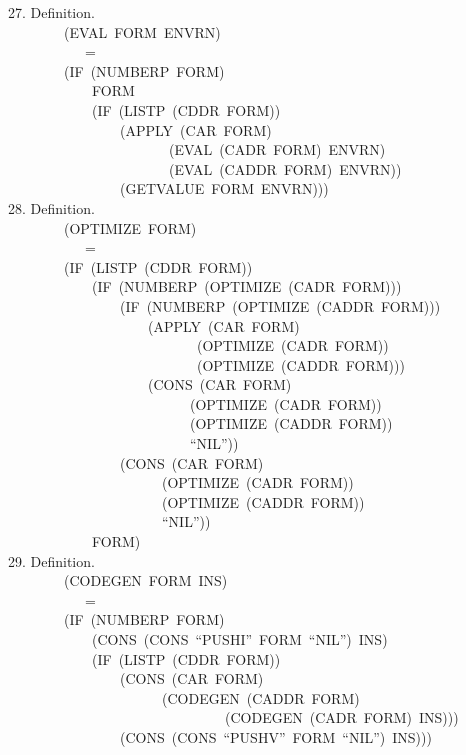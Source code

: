 \documentclass[10pt]{book}
\newenvironment{pubasis}{\begin{flushleft}}{\end{flushleft}}
\begin{document}
\begin{pubasis}
27.     Definition.\\
~~~~~~~~(EVAL~FORM~ENVRN)\\
~~~~~~~~~~~=\\
~~~~~~~~(IF~(NUMBERP~FORM)\\
~~~~~~~~~~~~FORM\\
~~~~~~~~~~~~(IF~(LISTP~(CDDR~FORM))\\
~~~~~~~~~~~~~~~~(APPLY~(CAR~FORM)\\
~~~~~~~~~~~~~~~~~~~~~~~(EVAL~(CADR~FORM)~ENVRN)\\
~~~~~~~~~~~~~~~~~~~~~~~(EVAL~(CADDR~FORM)~ENVRN))\\
~~~~~~~~~~~~~~~~(GETVALUE~FORM~ENVRN)))\\

28.     Definition.\\
~~~~~~~~(OPTIMIZE~FORM)\\
~~~~~~~~~~~=\\
~~~~~~~~(IF~(LISTP~(CDDR~FORM))\\
~~~~~~~~~~~~(IF~(NUMBERP~(OPTIMIZE~(CADR~FORM)))\\
~~~~~~~~~~~~~~~~(IF~(NUMBERP~(OPTIMIZE~(CADDR~FORM)))\\
~~~~~~~~~~~~~~~~~~~~(APPLY~(CAR~FORM)\\
~~~~~~~~~~~~~~~~~~~~~~~~~~~(OPTIMIZE~(CADR~FORM))\\
~~~~~~~~~~~~~~~~~~~~~~~~~~~(OPTIMIZE~(CADDR~FORM)))\\
~~~~~~~~~~~~~~~~~~~~(CONS~(CAR~FORM)\\
~~~~~~~~~~~~~~~~~~~~~~~~~~(OPTIMIZE~(CADR~FORM))\\
~~~~~~~~~~~~~~~~~~~~~~~~~~(OPTIMIZE~(CADDR~FORM))\\
~~~~~~~~~~~~~~~~~~~~~~~~~~``NIL''))\\
~~~~~~~~~~~~~~~~(CONS~(CAR~FORM)\\
~~~~~~~~~~~~~~~~~~~~~~(OPTIMIZE~(CADR~FORM))\\
~~~~~~~~~~~~~~~~~~~~~~(OPTIMIZE~(CADDR~FORM))\\
~~~~~~~~~~~~~~~~~~~~~~``NIL''))\\
~~~~~~~~~~~~FORM)\\

29.     Definition.\\
~~~~~~~~(CODEGEN~FORM~INS)\\
~~~~~~~~~~~=\\
~~~~~~~~(IF~(NUMBERP~FORM)\\
~~~~~~~~~~~~(CONS~(CONS~``PUSHI''~FORM~``NIL'')~INS)\\
~~~~~~~~~~~~(IF~(LISTP~(CDDR~FORM))\\
~~~~~~~~~~~~~~~~(CONS~(CAR~FORM)\\
~~~~~~~~~~~~~~~~~~~~~~(CODEGEN~(CADDR~FORM)\\
~~~~~~~~~~~~~~~~~~~~~~~~~~~~~~~(CODEGEN~(CADR~FORM)~INS)))\\
~~~~~~~~~~~~~~~~(CONS~(CONS~``PUSHV''~FORM~``NIL'')~INS)))\\


\end{pubasis}
\end{document}
